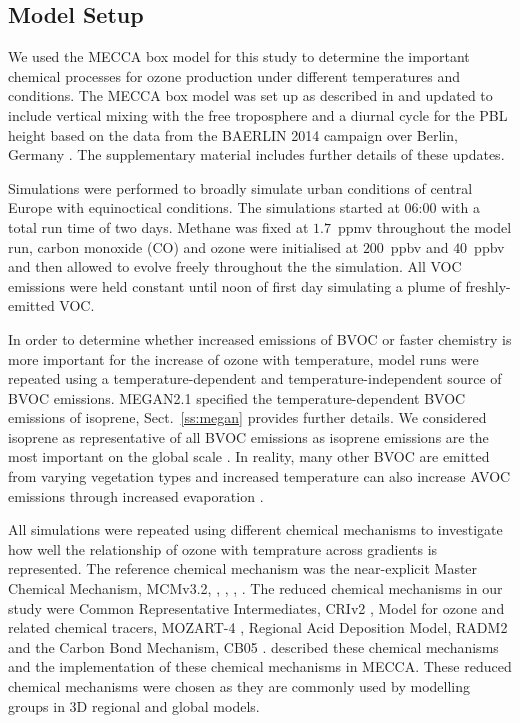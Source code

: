 \subsection{Model Setup} \label{ss:model_setup}
We used the MECCA box model for this study to determine the important chemical processes for ozone production under different temperatures and  conditions.
The MECCA box model was set up as described in \citet{Coates:2015} and updated to include vertical mixing with the free troposphere and a diurnal cycle for the PBL height based on the data from the BAERLIN 2014 campaign over Berlin, Germany \citep{Bonn:2016}. 
The supplementary material includes further details of these updates.

Simulations were performed to broadly simulate urban conditions of central Europe with equinoctical conditions.
The simulations started at 06:00 with a total run time of two days.
Methane was fixed at $1.7$~ppmv throughout the model run, carbon monoxide (CO) and ozone were initialised at $200$~ppbv and $40$~ppbv and then allowed to evolve freely throughout the the simulation.
All VOC emissions were held constant until noon of first day simulating a plume of freshly-emitted VOC.

In order to determine whether increased emissions of BVOC or faster chemistry is more important for the increase of ozone with temperature, model runs were repeated using a temperature-dependent and temperature-independent source of BVOC emissions. 
MEGAN2.1 \citep{Guenther:2012} specified the temperature-dependent BVOC emissions of isoprene, Sect.~\ref{ss:megan} provides further details. 
We considered isoprene as representative of all BVOC emissions as isoprene emissions are the most important on the global scale \citep{Guenther:2006}. 
In reality, many other BVOC are emitted from varying vegetation types \citep{Guenther:2006} and increased temperature can also increase AVOC emissions through increased evaporation \citep{Rubin:2006}.

All simulations were repeated using different chemical mechanisms to investigate how well the relationship of ozone with temprature across  gradients is represented.
The reference chemical mechanism was the near-explicit Master Chemical Mechanism, MCMv3.2, \citep{Jenkin:1997}, \citep{Jenkin:2003}, \citep{Saunders:2003}, \citep{MCM_Site}.
The reduced chemical mechanisms in our study were Common Representative Intermediates, CRIv2 \citep{Jenkin:2008}, Model for ozone and related chemical tracers, MOZART-4 \citep{Emmons:2010}, Regional Acid Deposition Model, RADM2 \citep{Stockwell:1990} and the Carbon Bond Mechanism, CB05 \citep{Yarwood:2005}. 
\citet{Coates:2015} described these chemical mechanisms and the implementation of these chemical mechanisms in MECCA.
These reduced chemical mechanisms were chosen as they are commonly used by modelling groups in 3D regional and global models.

